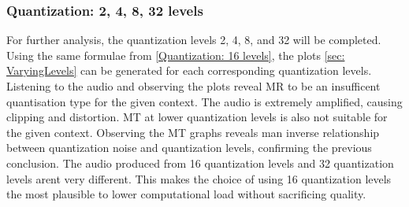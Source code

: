 \documentclass{article}
\begin{document}
\subsubsection{Quantization: 2, 4, 8, 32 levels}
For further analysis, the quantization levels 2, 4, 8, and 32 will be completed. Using the same formulae from \ref{Quantization: 16 levels}, the plots \ref{sec: VaryingLevels} can be generated for each corresponding quantization levels. Listening to the audio and observing the plots reveal MR to be an insufficent quantisation type for the given context. The audio is extremely amplified, causing clipping and distortion. MT at lower quantization levels is also not suitable for the given context. Observing the MT graphs reveals man inverse relationship between quantization noise and quantization levels, confirming the previous conclusion. The audio produced from 16 quantization levels and 32 quantization levels arent very different. This makes the choice of using 16 quantization levels the most plausible to lower computational load without sacrificing quality.
\end{document}
